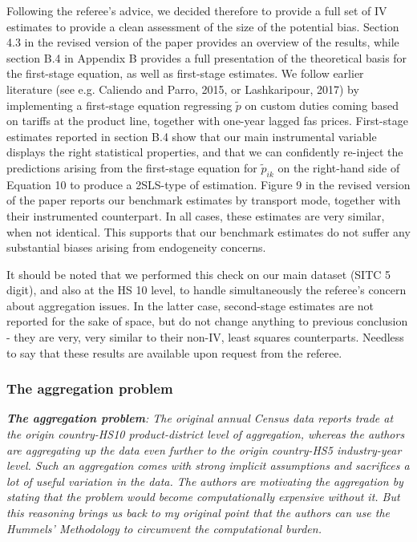 \documentclass[a4paper,11pt]{article}
\begin{document}
Following the referee's advice, we decided therefore to provide a full set of IV estimates to provide a clean assessment of the size of the potential bias. Section 4.3 in the revised version of the paper provides an overview of the results, while section B.4 in Appendix B provides a full presentation of the theoretical basis for the first-stage equation, as well as first-stage estimates. We follow earlier literature (see e.g. Caliendo and Parro, 2015, or Lashkaripour, 2017) by implementing a first-stage equation regressing $\widetilde{p}$ on custom duties coming based on tariffs at the product line, together with one-year lagged fas prices. First-stage estimates reported in section B.4 show that our main instrumental variable displays the right statistical properties, and that we can confidently re-inject the predictions arising from the first-stage equation for $\widetilde{p}_{ik}$ on the right-hand side of Equation 10 to produce a 2SLS-type of estimation. Figure 9 in the revised version of the paper reports our benchmark estimates by transport mode, together with their instrumented counterpart. In all cases, these estimates are very similar, when not identical. This supports that our benchmark estimates do not suffer any substantial biases arising from endogeneity concerns.

It should be noted that we performed this check on our main dataset (SITC 5 digit), and also at the HS 10 level, to handle simultaneously the referee's concern about aggregation issues. In the latter case, second-stage estimates are not reported for the sake of space, but do not change anything to previous conclusion - they are very, very similar to their non-IV, least squares counterparts. Needless to say that these results are available upon request from the referee.


\subsubsection{The aggregation problem}

\textit{\textbf{The aggregation problem}: The original annual Census data reports
trade at the origin country-HS10 product-district level of aggregation,
whereas the authors are aggregating up the data even further to the origin
country-HS5 industry-year level. Such an aggregation comes with strong implicit assumptions and sacrifices a lot of useful variation in the data.
The authors are motivating the aggregation by stating that the problem
would become computationally expensive without it. But this reasoning
brings us back to my original point that the authors can use the Hummels'
Methodology to circumvent the computational burden.}
\end{document}
